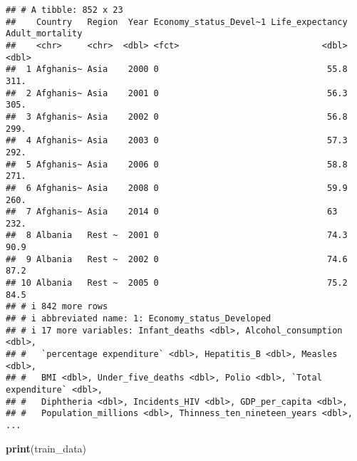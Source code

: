 \documentclass[
]{article}
\newenvironment{Shaded}{\begin{snugshade}}{\end{snugshade}}
\newcommand{\FunctionTok}[1]{\textcolor[rgb]{0.13,0.29,0.53}{\textbf{#1}}}
\newcommand{\NormalTok}[1]{#1}
\begin{document}
\begin{verbatim}
## # A tibble: 852 x 23
##    Country   Region  Year Economy_status_Devel~1 Life_expectancy Adult_mortality
##    <chr>     <chr>  <dbl> <fct>                            <dbl>           <dbl>
##  1 Afghanis~ Asia    2000 0                                 55.8           311. 
##  2 Afghanis~ Asia    2001 0                                 56.3           305. 
##  3 Afghanis~ Asia    2002 0                                 56.8           299. 
##  4 Afghanis~ Asia    2003 0                                 57.3           292. 
##  5 Afghanis~ Asia    2006 0                                 58.8           271. 
##  6 Afghanis~ Asia    2008 0                                 59.9           260. 
##  7 Afghanis~ Asia    2014 0                                 63             232. 
##  8 Albania   Rest ~  2001 0                                 74.3            90.9
##  9 Albania   Rest ~  2002 0                                 74.6            87.2
## 10 Albania   Rest ~  2005 0                                 75.2            84.5
## # i 842 more rows
## # i abbreviated name: 1: Economy_status_Developed
## # i 17 more variables: Infant_deaths <dbl>, Alcohol_consumption <dbl>,
## #   `percentage expenditure` <dbl>, Hepatitis_B <dbl>, Measles <dbl>,
## #   BMI <dbl>, Under_five_deaths <dbl>, Polio <dbl>, `Total expenditure` <dbl>,
## #   Diphtheria <dbl>, Incidents_HIV <dbl>, GDP_per_capita <dbl>,
## #   Population_millions <dbl>, Thinness_ten_nineteen_years <dbl>, ...
\end{verbatim}

\begin{Shaded}
\begin{Highlighting}[]
\FunctionTok{print}\NormalTok{(train\_data)}
\end{Highlighting}
\end{Shaded}
\end{document}
